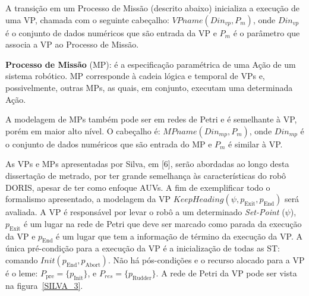 A transição em um Processo de Missão (descrito abaixo) inicializa a execução de
uma VP, chamada com o seguinte cabeçalho: $VPname(Din_{vp},P_m)$, onde
$Din_{vp}$ é o conjunto de dados numéricos que são entrada da VP e $P_m$ é o
parâmetro que associa a VP ao Processo de Missão.

\textbf{Processo de Missão} (MP): é a especificação paramétrica de uma Ação de
um sistema robótico. MP corresponde à cadeia lógica e temporal de VPs e,
possivelmente, outras MPs, as quais, em conjunto, executam uma determinada Ação.

A modelagem de MPs também pode ser em redes de Petri e é semelhante à VP, porém
em maior alto nível. O cabeçalho é: $MPname(Din_{mp},P_m)$, onde
$Din_{mp}$ é o conjunto de dados numéricos que são entrada do MP e $P_m$ é
similar à VP.

As VPs e MPs apresentadas por Silva, em [6], serão abordadas ao longo desta
dissertação de metrado, por ter grande semelhança às características do robô
DORIS, apesar de ter como enfoque AUVs. A fim de exemplificar todo o formalismo
apresentado, a modelagem da VP
$KeepHeading(\psi,p_{\textrm{Exit}},p_{\textrm{End}})$ será avaliada. A
VP é responsável por levar o robô a um determinado \emph{Set-Point} ($\psi$),
$p_{\textrm{Exit}}$ é um lugar na rede de Petri que deve ser marcado como parada
da execução da VP e $p_{\textrm{End}}$ é um lugar que tem a informação de
término da execução da VP. A única pré-condição para a execução da VP é a
inicialização de todas as ST: comando
$Init(p_{\textrm{End}},p_{\textrm{Abort}})$. Não há pós-condições e o recurso
alocado para a VP é o leme: $P_{\textrm{pre}}=\{p_{\textrm{Init}}\}$, e
$P_{res}=\{p_{\textrm{Rudder}}\}$.
A rede de Petri da VP pode ser vista na figura~\ref{SILVA_3}.


